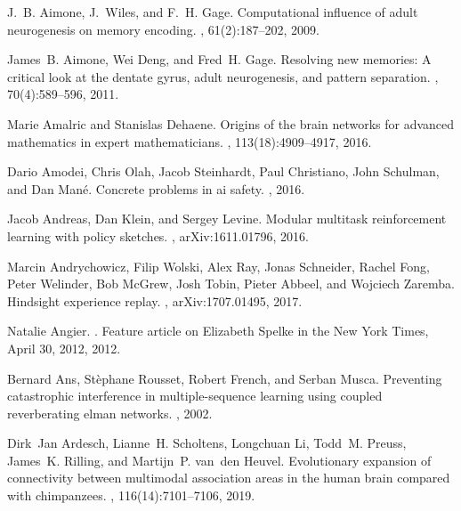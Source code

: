 \documentclass[letterpaper,11pt]{article}
\begin{document}
\begin{thebibliography}{100}

J.~B. Aimone, J.~Wiles, and F.~H. Gage.
\newblock Computational influence of adult neurogenesis on memory encoding.
, 61(2):187--202, 2009.

James~B. Aimone, Wei Deng, and Fred~H. Gage.
\newblock Resolving new memories: A critical look at the dentate gyrus, adult
  neurogenesis, and pattern separation.
, 70(4):589--596, 2011.

Marie Amalric and Stanislas Dehaene.
\newblock Origins of the brain networks for advanced mathematics in expert
  mathematicians.
,
  113(18):4909--4917, 2016.

Dario Amodei, Chris Olah, Jacob Steinhardt, Paul Christiano, John Schulman, and
  Dan Man{\'e}.
\newblock Concrete problems in ai safety.
, 2016.

Jacob Andreas, Dan Klein, and Sergey Levine.
\newblock Modular multitask reinforcement learning with policy sketches.
, arXiv:1611.01796, 2016.

Marcin Andrychowicz, Filip Wolski, Alex Ray, Jonas Schneider, Rachel Fong,
  Peter Welinder, Bob McGrew, Josh Tobin, Pieter Abbeel, and Wojciech Zaremba.
\newblock Hindsight experience replay.
, arXiv:1707.01495, 2017.

Natalie Angier.
.
\newblock Feature article on Elizabeth Spelke in the New York Times, April 30,
  2012, 2012.

Bernard Ans, St\`{e}phane Rousset, Robert French, and Serban Musca.
\newblock Preventing catastrophic interference in multiple-sequence learning
  using coupled reverberating elman networks.
, 2002.

Dirk~Jan Ardesch, Lianne~H. Scholtens, Longchuan Li, Todd~M. Preuss, James~K.
  Rilling, and Martijn~P. van~den Heuvel.
\newblock Evolutionary expansion of connectivity between multimodal association
  areas in the human brain compared with chimpanzees.
,
  116(14):7101--7106, 2019.


\end{thebibliography}
\end{document}
